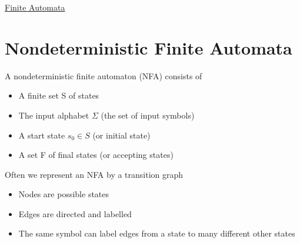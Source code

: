 \documentclass{article}[18pt]
\begin{document}
\begin{center}
\underline{\huge Finite Automata}
\end{center}
\section{Nondeterministic Finite Automata}
A nondeterministic finite automaton (NFA) consists of
\begin{itemize}
	\item A finite set S of states
	\item The input alphabet $\Sigma$ (the set of input symbols)
	\item A start state $s_0\in S$ (or initial state)
	\item A set F of final states (or accepting states)
\end{itemize}
Often we represent an NFA by a transition graph
\begin{itemize}
	\item Nodes are possible states
	\item Edges are directed and labelled
	\item The same symbol can label edges from a state to many different other states 
\end{itemize}
\end{document}
